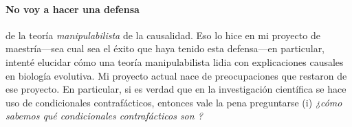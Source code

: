 {%








\paragraph{No voy a hacer una defensa} de la teoría
\emph{manipulabilista} de la causalidad. Eso lo hice en mi
proyecto de maestría---sea cual sea el éxito que haya tenido
esta defensa---en particular, intenté elucidar cómo una
teoría manipulabilista lidia con explicaciones causales en
biología evolutiva. Mi proyecto actual nace de
preocupaciones que restaron de ese proyecto. En particular,
si es verdad que en la investigación científica se hace uso
de condicionales contrafácticos, entonces vale la pena
preguntarse (i) \emph{¿cómo sabemos qué condicionales
contrafácticos son ?}

}
